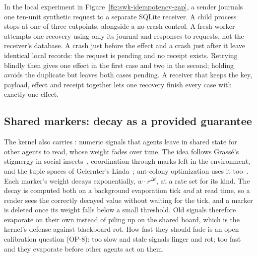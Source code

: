 \documentclass[11pt,a4paper]{article}
\theoremstyle{definition}
\theoremstyle{remark}
\begin{document}

In the local experiment in Figure~\ref{fig:swk-idempotency-gap}, a sender
journals one ten-unit synthetic request to a separate SQLite receiver. A child
process stops at one of three cutpoints, alongside a no-crash control. A fresh
worker attempts one recovery using only its journal and responses to
requests, not the receiver's database. A crash just before the effect and a
crash just after it leave identical local records: the request is pending and
no receipt exists. Retrying blindly then gives one effect in the first case
and two in the second; holding avoids the duplicate but leaves both cases
pending. A receiver that keeps the key, payload, effect and receipt together
lets one recovery finish every case with exactly one effect.



\pagebreak[4]
\subsection{Shared markers: decay as a provided guarantee}

The kernel also carries : numeric signals that
agents leave in shared state for other agents to read, whose weight fades over
time. The idea follows Grass\'e's stigmergy in social
insects~, coordination through marks left in the
environment, and the tuple spaces of Gelernter's Linda~;
ant-colony optimization uses it too~. Each marker's weight
decays exponentially, $w \cdot r^{\Delta t}$, at a rate set for its kind. The
decay is computed both on a background evaporation tick \emph{and} at read
time, so a reader sees the correctly decayed value without waiting for the
tick, and a marker is deleted once its weight falls below a small threshold.
Old signals therefore evaporate on their own instead of piling up on the
shared board, which is the kernel's defense against blackboard rot. How fast
they should fade is an open calibration question (OP-8): too slow and stale
signals linger and rot; too fast and they evaporate before other agents act on
them.
\end{document}
